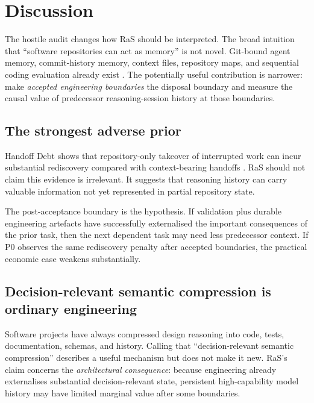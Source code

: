 \section{Discussion}
\label{sec:discussion}

The hostile audit changes how RaS should be interpreted. The broad intuition that “software repositories can act as memory” is not novel. Git-bound agent memory, commit-history memory, context files, repository maps, and sequential coding evaluation already exist \citep{guo2026gitmemory,wang2025repomemory,li2026learningcommit,shastry2026swesteps}. The potentially useful contribution is narrower: make \emph{accepted engineering boundaries} the disposal boundary and measure the causal value of predecessor reasoning-session history at those boundaries.

\subsection{The strongest adverse prior}

Handoff Debt shows that repository-only takeover of interrupted work can incur substantial rediscovery compared with context-bearing handoffs \citep{kc2026handoff}. RaS should not claim this evidence is irrelevant. It suggests that reasoning history can carry valuable information not yet represented in partial repository state.

The post-acceptance boundary is the hypothesis. If validation plus durable engineering artefacts have successfully externalised the important consequences of the prior task, then the next dependent task may need less predecessor context. If P0 observes the same rediscovery penalty after accepted boundaries, the practical economic case weakens substantially.

\subsection{Decision-relevant semantic compression is ordinary engineering}

Software projects have always compressed design reasoning into code, tests, documentation, schemas, and history. Calling that “decision-relevant semantic compression” describes a useful mechanism but does not make it new. RaS's claim concerns the \emph{architectural consequence}: because engineering already externalises substantial decision-relevant state, persistent high-capability model history may have limited marginal value after some boundaries.

